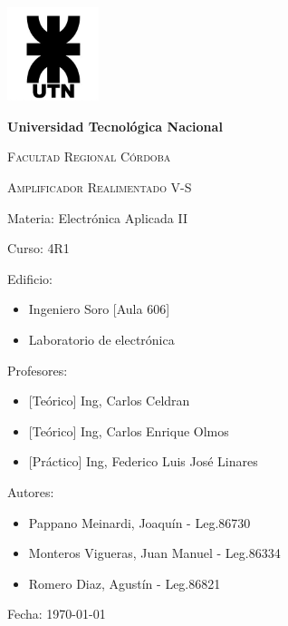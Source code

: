 \documentclass[12pt, letterpaper]{article}
\begin{document}
\begin{titlepage}
	\centering %
	{\includegraphics[width=0.2\textwidth]{Imagenes/UTN_logo.jpg}\par}
	{\bfseries\LARGE Universidad Tecnológica Nacional \par}
	{\scshape\Large Facultad Regional Córdoba\par}
	\vspace{1cm}
	{\scshape\Huge Amplificador Realimentado V-S \par}%
	\raggedright %
	\vspace{1cm}
	{\Large Materia: Electrónica Aplicada II \par}%
	\vspace{0.5cm}
	{\Large Curso: 4R1 \par}
	\vspace{0.5cm}
	{\Large Edificio: \par}%
	\begin{itemize}
		\item{\Large Ingeniero Soro [Aula 606] \par}
		\item{\Large Laboratorio de electrónica \par}
	\end{itemize}
	\vspace{0.5cm}
	{\Large Profesores: \par} %
	\begin{itemize}
		\item{\Large [Teórico] Ing, Carlos Celdran \par}
		\item{\Large [Teórico] Ing, Carlos Enrique Olmos \par}
		\item{\Large [Práctico] Ing, Federico Luis José Linares \par}
	\end{itemize}
	\vspace{0.5cm}
	{\Large Autores: \par} %
	\begin{itemize}
		\item{\Large Pappano Meinardi, Joaquín - Leg.86730\par}
		\item{\Large Monteros Vigueras, Juan Manuel - Leg.86334\par}
		\item{\Large Romero Diaz, Agustín - Leg.86821\par}
	\end{itemize}
	\vspace{0.5cm}
	{\Large Fecha: {\today} \par}%
\end{titlepage}
\end{document}
